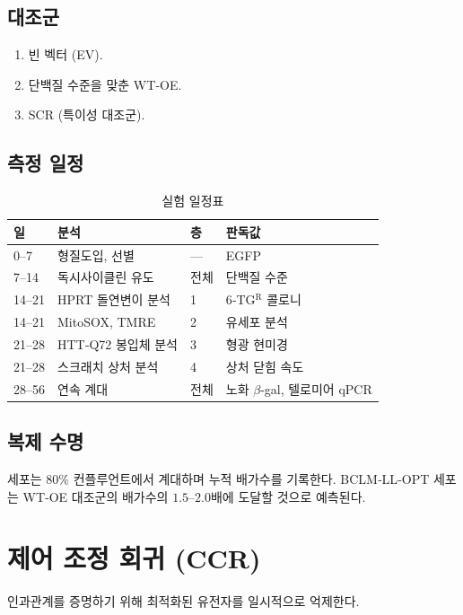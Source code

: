 \documentclass[12pt,a4paper]{article}
\begin{document}
	\subsection{대조군}
	\begin{enumerate}
		\item 빈 벡터 (EV).
		\item 단백질 수준을 맞춘 WT‑OE.
		\item SCR (특이성 대조군).
	\end{enumerate}
	
	\subsection{측정 일정}
	\begin{table}[H]
		\centering
		\caption{실험 일정표}
		\label{tab:schedule}
		\begin{tabular}{@{}llll@{}}
			\toprule
			\textbf{일} & \textbf{분석} & \textbf{층} & \textbf{판독값} \\
			\midrule
			0–7   & 형질도입, 선별 & --- & EGFP \\
			7–14  & 독시사이클린 유도 & 전체 & 단백질 수준 \\
			14–21 & HPRT 돌연변이 분석 & 1 & 6‑TG\(^{\mathrm{R}}\) 콜로니 \\
			14–21 & MitoSOX, TMRE & 2 & 유세포 분석 \\
			21–28 & HTT‑Q72 봉입체 분석 & 3 & 형광 현미경 \\
			21–28 & 스크래치 상처 분석 & 4 & 상처 닫힘 속도 \\
			28–56 & 연속 계대 & 전체 & 노화 \(\beta\)-gal, 텔로미어 qPCR \\
			\bottomrule
		\end{tabular}
	\end{table}
	
	\subsection{복제 수명}
	세포는 80\% 컨플루언트에서 계대하며 누적 배가수를 기록한다. BCLM‑LL‑OPT 세포는 WT‑OE 대조군의 배가수의 \(1.5\)–\(2.0\)배에 도달할 것으로 예측된다.
	
	\section{제어 조정 회귀 (CCR)}
	\label{sec:CCR}
	인과관계를 증명하기 위해 최적화된 유전자를 일시적으로 억제한다.
	
\end{document}

